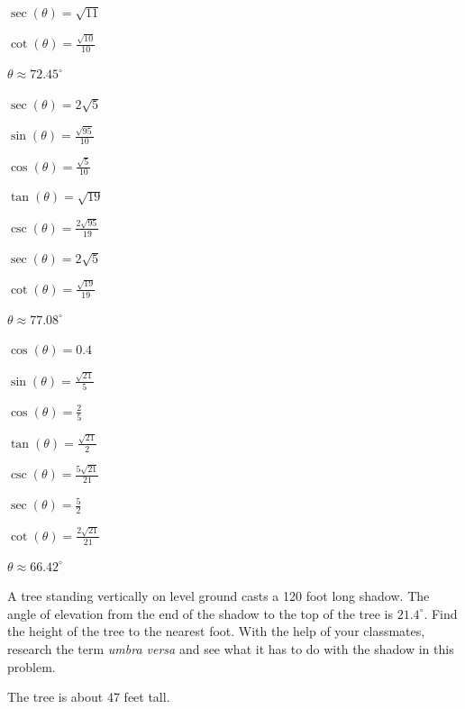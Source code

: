 \documentclass{ximera}
\begin{document}
\begin{question}
\begin{problem}
\begin{solution}
$\sec(\theta) = \sqrt{11}$

$\cot(\theta) = \frac{\sqrt{10}}{10}$

$\theta \approx 72.45^{\circ}$
\end{solution}

\end{problem}

\begin{problem}
$\sec(\theta) = 2\sqrt{5}$

\begin{solution}
$\sin(\theta) = \frac{\sqrt{95}}{10}$

$\cos(\theta) = \frac{\sqrt{5}}{10}$

$\tan(\theta) = \sqrt{19}$

$\csc(\theta) = \frac{2\sqrt{95}}{19}$

$\sec(\theta) = 2\sqrt{5}$

$\cot(\theta) = \frac{\sqrt{19}}{19}$

$\theta \approx 77.08^{\circ}$
\end{solution}
\end{problem}

\begin{problem} \label{findothercirclastapprighttrig}
$\cos(\theta) = 0.4$

\begin{solution}
$\sin(\theta) = \frac{\sqrt{21}}{5}$

$\cos(\theta) = \frac{2}{5}$

$\tan(\theta) = \frac{\sqrt{21}}{2}$

$\csc(\theta) = \frac{5\sqrt{21}}{21}$

$\sec(\theta) = \frac{5}{2}$

$\cot(\theta) = \frac{2\sqrt{21}}{21}$

$\theta \approx  66.42^{\circ}$
\end{solution}
\end{problem}

\end{question}

\begin{problem}
A tree standing vertically on level ground casts a 120 foot long shadow.  The angle of elevation from the end of the shadow to the top of the tree is $21.4^{\circ}$.  Find the height of the tree to the nearest foot.  With the help of your classmates, research the term \emph{umbra versa} and see what it has to do with the shadow in this problem.

\begin{solution}
The tree is about 47 feet tall.
\end{solution}
\end{problem}
\end{document}
